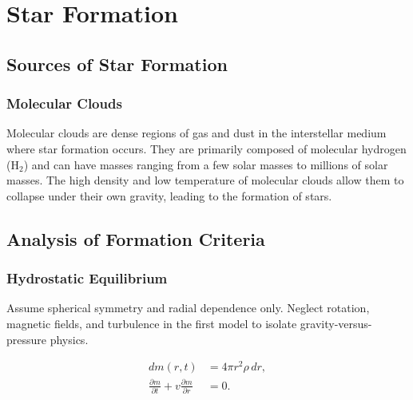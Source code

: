 \chapter{Star Formation}

\bigskip\noindent \bigskip\noindent \bigskip\noindent
\section{Sources of Star Formation}

\subsection{Molecular Clouds}
\begin{intuition}
Molecular clouds are dense regions of gas and dust in the interstellar medium where star formation occurs. They are primarily composed of molecular hydrogen (H$_2$) and can have masses ranging from a few solar masses to millions of solar masses. The high density and low temperature of molecular clouds allow them to collapse under their own gravity, leading to the formation of stars.
\end{intuition}

\bigskip\noindent \bigskip\noindent \bigskip\noindent
\section{Analysis of Formation Criteria}
\subsection{Hydrostatic Equilibrium}
\begin{foundation}
Assume spherical symmetry and radial dependence only.
Neglect rotation, magnetic fields, and turbulence in the first model to isolate gravity-versus-pressure physics.
\end{foundation}

\begin{theory}
\begin{align}
    dm(r,t) &= 4\pi r^2\rho\,dr, \\
    \frac{\partial m}{\partial t}+v\frac{\partial m}{\partial r} &= 0.
\end{align}
\end{theory}

